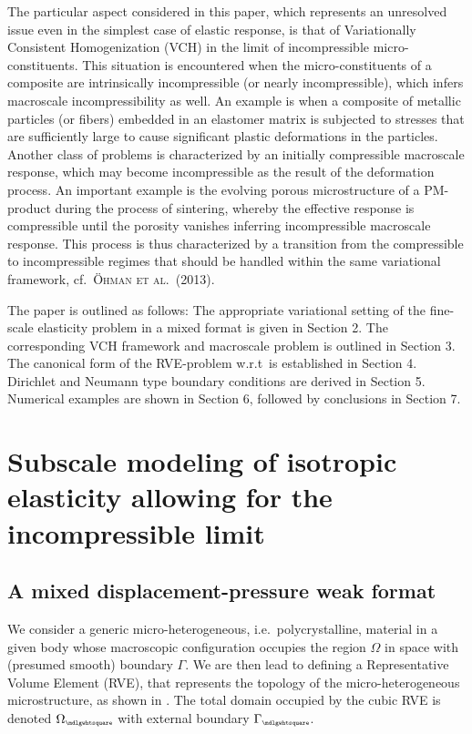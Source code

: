\documentclass[12pt,a4paper]{article}
\renewcommand{\ta}[1]{\mathbfit{#1}}
\renewcommand{\Box}{\mdlgwhtsquare}
\newcommand{\rve}{
  {\mathchoice
   {\mbox{\scalebox{0.67}{$\Box$}}}
   {\mbox{\scalebox{0.67}{$\Box$}}}
   {\mbox{\scalebox{0.5}{$\Box$}}}
   {\mbox{\scalebox{0.375}{$\Box$}}}
  }
}
\begin{document}
The particular aspect considered in this paper, which represents an unresolved issue even in the simplest case of elastic response, is that of Variationally Consistent Homogenization (VCH) in the limit of incompressible micro-constituents.
This situation is encountered when the micro-constituents of a composite are intrinsically incompressible (or nearly incompressible), which infers macroscale incompressibility as well.
An example is when a composite of metallic particles (or fibers) embedded in an elastomer matrix is subjected to stresses that are sufficiently large to cause significant plastic deformations in the particles.
Another class of problems is characterized by an initially compressible macroscale response, which may become incompressible as the result of the deformation process.
An important example is the evolving porous microstructure of a PM-product during the process of sintering, whereby the effective response is compressible until the porosity vanishes inferring incompressible macroscale response.
This process is thus characterized by a transition from the compressible to incompressible regimes that should be handled within the same variational framework, cf.\  \textsc{Öhman et al.\ (2013)}.

The paper is outlined as follows:
The appropriate variational setting of the fine-scale elasticity problem in a mixed format is given in Section 2.
The corresponding VCH framework and macroscale problem is outlined in Section 3.
The canonical form of the RVE-problem w.r.t\ is established in Section 4.
Dirichlet and Neumann type boundary conditions are derived in Section 5.
Numerical examples are shown in Section 6, followed by conclusions in Section 7.


\section{Subscale modeling of isotropic elasticity allowing for the incompressible limit}

\subsection{A mixed displacement-pressure weak format}

We consider a generic micro-heterogeneous, i.e.\ polycrystalline, material in a given body whose macroscopic configuration occupies the region $\Omega$ in space with (presumed smooth) boundary $\Gamma$.
We are then lead to defining a Representative Volume Element (RVE), that represents the topology of the micro-heterogeneous microstructure, as shown in .
The total domain occupied by the cubic RVE is denoted $\Omega_\rve$ with external boundary $\Gamma_\rve$.
\end{document}
